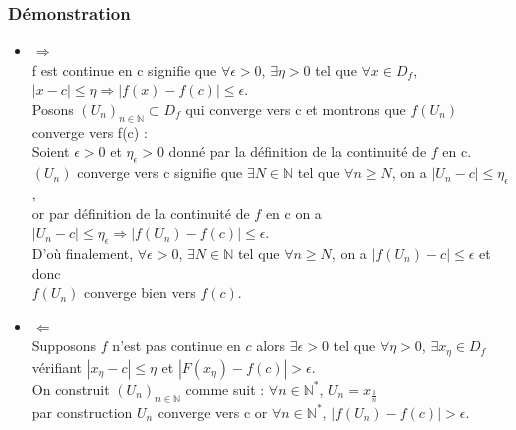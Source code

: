 \documentclass[a4paper,10pt]{book} %
\newcommand{\N}{\mathbb{N}}
\begin{document}
\subsubsection{Démonstration}
\begin{itemize}\renewcommand{\labelitemi}{$\bullet$} \item $\Rightarrow$\\
f est continue en c signifie que $\forall \epsilon>0$, $\exists \eta>0$ tel que $\forall x\in D_{f}$, $|x-c|\leq \eta \Rightarrow |f(x)-f(c)|\leq \epsilon$.\\
Posons $(U_{n})_{n\in\N}\subset D_{f}$ qui converge vers c et montrons que $f(U_{n})$ converge vers f(c) :\\

Soient $\epsilon>0$ et $\eta_{\epsilon}>0$ donné par la définition de la continuité de $f$ en c.\\
$(U_{n})$ converge vers c signifie que $\exists N\in \N$ tel que $\forall n\geq N$, on a $|U_{n}-c|\leq \eta_{\epsilon}$,\\
or par définition de la continuité de $f$ en c on a $|U_{n}-c|\leq \eta_{\epsilon} \Rightarrow |f(U_{n})-f(c)|\leq \epsilon$.\\

D'où finalement, $\forall \epsilon>0$, $\exists N\in \N$ tel que $\forall n\geq N$, on a $|f(U_{n})-c|\leq \epsilon$
et donc\\
$f(U_{n})$ converge bien vers $f(c)$.\\

\item $\Leftarrow$\\
Supposons $f$ n'est pas continue en $c$ alors $\exists\epsilon>0$ tel que $\forall\eta>0$, $\exists x_{\eta}\in D_{f}$\\
vérifiant $|x_{\eta}-c|\leq \eta$ et $|F(x_{\eta})-f(c)|>\epsilon$.\\

On construit $(U_{n})_{n\in\N}$ comme suit : $\forall n\in \N^{*}$, $U_{n}=x_{\frac{1}{n}}$\\
par construction $U_{n}$ converge vers c or $\forall n\in \N^{*}$, $|f(U_{n})-f(c)|>\epsilon$.
\end{itemize}
\end{document}
